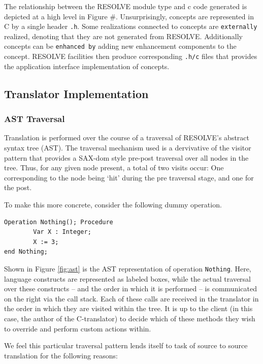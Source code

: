 \documentclass{sig-alternate}
\begin{document}
The relationship between the RESOLVE module type and c code generated is depicted at a high level in Figure \#. Unsurprisingly, concepts are represented in C by a single header \texttt{.h}. Some realizations connected to concepts are \texttt{externally} realized, denoting that they are not generated from RESOLVE. Additionally concepts can be \texttt{enhanced by} adding new enhancement components to the concept. RESOLVE facilities then produce corresponding \texttt{.h/c} files that provides the application interface implementation of concepts.


\subsection{Translator Implementation}

\subsubsection{AST Traversal}
Translation is performed over the course of a traversal of RESOLVE's abstract syntax tree (AST). The traversal mechanism used is a dervivative of the visitor pattern that provides a SAX-dom style pre-post traversal over all nodes in the tree. Thus, for any given node present, a total of two visits occur: One corresponding to the node being `hit' during the pre traversal stage, and one for the post. 

To make this more concrete, consider the following dummy operation.

\begin{verbatim}
Operation Nothing(); Procedure
        Var X : Integer;
        X := 3;
end Nothing;
\end{verbatim}

Shown in Figure \ref{fig:ast} is the AST representation of operation \texttt{Nothing}. Here, language constructs are represented as labeled boxes, while the actual traversal over these constructs -- and the order in which it is performed -- is communicated on the right via the call stack. Each of these calls are received in the translator in the order in which they are visited within the tree. It is up to the client (in this case, the author of the C-translator) to decide which of these methods they wish to override and perform custom actions within. 

We feel this particular traversal pattern lends itself to task of source to source translation for the following reasons:
\end{document}

